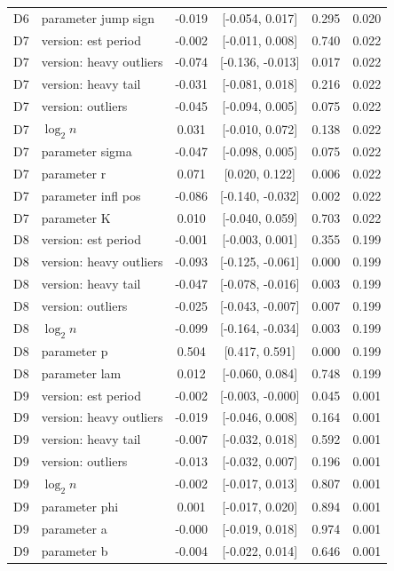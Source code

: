 \begin{table}[!htbp]
\begin{threeparttable}
\begin{tabular}{llcccc}
D6 & parameter jump sign & -0.019 & [-0.054, 0.017] & 0.295 & 0.020 \\
D7 & version: est period & -0.002 & [-0.011, 0.008] & 0.740 & 0.022 \\
D7 & version: heavy outliers & -0.074 & [-0.136, -0.013] & 0.017 & 0.022 \\
D7 & version: heavy tail & -0.031 & [-0.081, 0.018] & 0.216 & 0.022 \\
D7 & version: outliers & -0.045 & [-0.094, 0.005] & 0.075 & 0.022 \\
D7 & $\log_2 n$ & 0.031 & [-0.010, 0.072] & 0.138 & 0.022 \\
D7 & parameter sigma & -0.047 & [-0.098, 0.005] & 0.075 & 0.022 \\
D7 & parameter r & 0.071 & [0.020, 0.122] & 0.006 & 0.022 \\
D7 & parameter infl pos & -0.086 & [-0.140, -0.032] & 0.002 & 0.022 \\
D7 & parameter K & 0.010 & [-0.040, 0.059] & 0.703 & 0.022 \\
D8 & version: est period & -0.001 & [-0.003, 0.001] & 0.355 & 0.199 \\
D8 & version: heavy outliers & -0.093 & [-0.125, -0.061] & 0.000 & 0.199 \\
D8 & version: heavy tail & -0.047 & [-0.078, -0.016] & 0.003 & 0.199 \\
D8 & version: outliers & -0.025 & [-0.043, -0.007] & 0.007 & 0.199 \\
D8 & $\log_2 n$ & -0.099 & [-0.164, -0.034] & 0.003 & 0.199 \\
D8 & parameter p & 0.504 & [0.417, 0.591] & 0.000 & 0.199 \\
D8 & parameter lam & 0.012 & [-0.060, 0.084] & 0.748 & 0.199 \\
D9 & version: est period & -0.002 & [-0.003, -0.000] & 0.045 & 0.001 \\
D9 & version: heavy outliers & -0.019 & [-0.046, 0.008] & 0.164 & 0.001 \\
D9 & version: heavy tail & -0.007 & [-0.032, 0.018] & 0.592 & 0.001 \\
D9 & version: outliers & -0.013 & [-0.032, 0.007] & 0.196 & 0.001 \\
D9 & $\log_2 n$ & -0.002 & [-0.017, 0.013] & 0.807 & 0.001 \\
D9 & parameter phi & 0.001 & [-0.017, 0.020] & 0.894 & 0.001 \\
D9 & parameter a & -0.000 & [-0.019, 0.018] & 0.974 & 0.001 \\
D9 & parameter b & -0.004 & [-0.022, 0.014] & 0.646 & 0.001 \\

\end{tabular}
\end{threeparttable}
\end{table}
